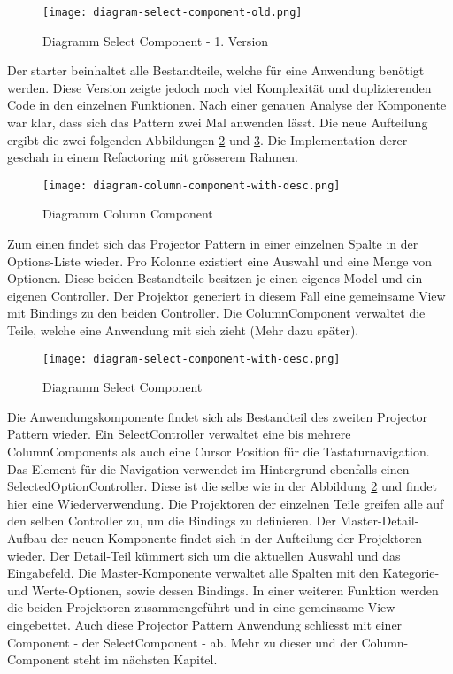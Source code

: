 \begin{figure}[!htb]
    \centering
    \texttt{[image: diagram-select-component-old.png]}
    \caption{Diagramm Select Component - 1. Version}
    \label{Abbildung:DiagramSelectComponentOld}
\end{figure}

Der starter beinhaltet alle Bestandteile, welche für eine Anwendung benötigt werden.
Diese Version zeigte jedoch noch viel Komplexität und duplizierenden Code in den einzelnen Funktionen.
Nach einer genauen Analyse der Komponente war klar, dass sich das Pattern zwei Mal anwenden lässt.
Die neue Aufteilung ergibt die zwei folgenden Abbildungen \ref{Abbildung:DiagramColumnComponent} und \ref{Abbildung:DiagramSelectComponent}.
Die Implementation derer geschah in einem Refactoring mit grösserem Rahmen.

\begin{figure}[!htb]
    \centering
    \texttt{[image: diagram-column-component-with-desc.png]}
    \caption{Diagramm Column Component}
    \label{Abbildung:DiagramColumnComponent}
\end{figure}

Zum einen findet sich das Projector Pattern in einer einzelnen Spalte in der Options-Liste wieder.
Pro Kolonne existiert eine Auswahl und eine Menge von Optionen.
Diese beiden Bestandteile besitzen je einen eigenes Model und ein eigenen Controller.
Der Projektor generiert in diesem Fall eine gemeinsame View mit Bindings zu den beiden Controller.
Die ColumnComponent verwaltet die Teile, welche eine Anwendung mit sich zieht (Mehr dazu später).

\begin{figure}[!htb]
    \centering
    \texttt{[image: diagram-select-component-with-desc.png]}
    \caption{Diagramm Select Component}
    \label{Abbildung:DiagramSelectComponent}
\end{figure}

Die Anwendungskomponente findet sich als Bestandteil des zweiten Projector Pattern wieder.
Ein SelectController verwaltet eine bis mehrere ColumnComponents als auch eine Cursor Position für die Tastaturnavigation.
Das Element für die Navigation verwendet im Hintergrund ebenfalls einen SelectedOptionController. 
Diese ist die selbe wie in der Abbildung \ref{Abbildung:DiagramColumnComponent} und findet hier eine Wiederverwendung.
Die Projektoren der einzelnen Teile greifen alle auf den selben Controller zu, um die Bindings zu definieren.
Der Master-Detail-Aufbau der neuen Komponente findet sich in der Aufteilung der Projektoren wieder.
Der Detail-Teil kümmert sich um die aktuellen Auswahl und das Eingabefeld.
Die Master-Komponente verwaltet alle Spalten mit den Kategorie- und Werte-Optionen, sowie dessen Bindings.
In einer weiteren Funktion werden die beiden Projektoren zusammengeführt und in eine gemeinsame View eingebettet.
Auch diese Projector Pattern Anwendung schliesst mit einer Component - der SelectComponent - ab.
Mehr zu dieser und der Column-Component steht im nächsten Kapitel.


